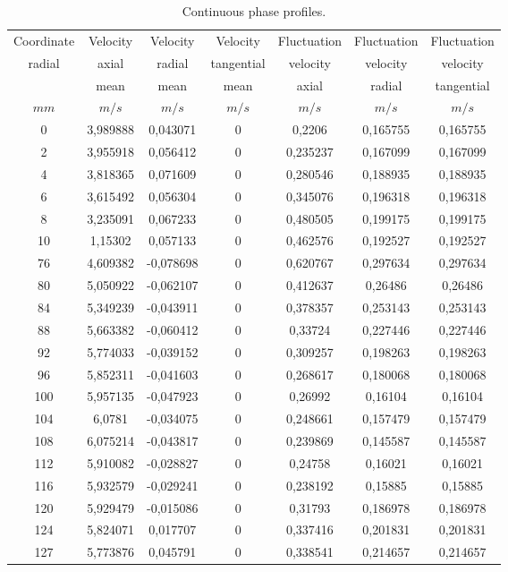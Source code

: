 \documentclass[a4paper,twoside,12pt]{article}
\begin{document}
\begin{itemize}
\begin{description}
\begin{table}[ht]
\begin{center}
\begin{tabular}{|c|c|c|c|c|c|c|} \hline
Coordinate  & Velocity  & Velocity  & Velocity &
Fluctuation  & Fluctuation  & Fluctuation  \\
radial  & axial    &   radial  &  tangential   & velocity
& velocity    & velocity   \\
&mean & mean  & mean &  axial
&    radial &  tangential  \\
$mm$   & $m/s$  &  $m/s$ & $m/s$ & $m/s$& $m/s$& $m/s$ \\  \hline
0    & 3,989888 &  0,043071 & 0  & 0,2206   & 0,165755 & 0,165755 \\   \hline
2    & 3,955918 &  0,056412 & 0  & 0,235237 & 0,167099 & 0,167099 \\   \hline
4    & 3,818365 &  0,071609 & 0  & 0,280546 & 0,188935 & 0,188935 \\   \hline
6    & 3,615492 &  0,056304 & 0  & 0,345076 & 0,196318 & 0,196318 \\   \hline
8    & 3,235091 &  0,067233 & 0  & 0,480505 & 0,199175 & 0,199175 \\   \hline
10    & 1,15302  &  0,057133 & 0  & 0,462576 & 0,192527 & 0,192527 \\   \hline
76    & 4,609382 & -0,078698 & 0  & 0,620767 & 0,297634 & 0,297634 \\   \hline
80    & 5,050922 & -0,062107 & 0  & 0,412637 & 0,26486  & 0,26486  \\   \hline
84    & 5,349239 & -0,043911 & 0  & 0,378357 & 0,253143 & 0,253143 \\   \hline
88    & 5,663382 & -0,060412 & 0  & 0,33724  & 0,227446 & 0,227446 \\   \hline
92    & 5,774033 & -0,039152 & 0  & 0,309257 & 0,198263 & 0,198263 \\   \hline
96    & 5,852311 & -0,041603 & 0  & 0,268617 & 0,180068 & 0,180068 \\   \hline
100    & 5,957135 & -0,047923 & 0  & 0,26992  & 0,16104  & 0,16104  \\   \hline
104    & 6,0781   & -0,034075 & 0  & 0,248661 & 0,157479 & 0,157479 \\   \hline
108    & 6,075214 & -0,043817 & 0  & 0,239869 & 0,145587 & 0,145587 \\   \hline
112    & 5,910082 & -0,028827 & 0  & 0,24758  & 0,16021  & 0,16021  \\   \hline
116    & 5,932579 & -0,029241 & 0  & 0,238192 & 0,15885  & 0,15885  \\   \hline
120    & 5,929479 & -0,015086 & 0  & 0,31793  & 0,186978 & 0,186978 \\   \hline
124    & 5,824071 &  0,017707 & 0  & 0,337416 & 0,201831 & 0,201831 \\   \hline
127    & 5,773876 &  0,045791 & 0  & 0,338541 & 0,214657 & 0,214657 \\   \hline
\end {tabular}
\end{center}
\caption{Continuous phase profiles.}
\label{CL_fluide}
\end{table}


\end{description}
\end{itemize}
\end{document}
